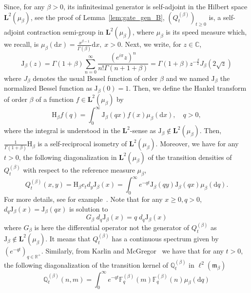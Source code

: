 \documentclass[AHL,Unicode,longabstracts]{cedram}
\newcommand{\fm}{\mathfrak{m}}
\newcommand{\esL}{\mathbf{L}}
\newcommand{\esLd}{\ell}
\newcommand{\Hg}{{\mathrm{H}}_{\beta}}
\newcommand{\Jg}{{\mathrm{J}}_{\beta}}
\newcommand*\R{{\mathbb R}}
\newcommand{\cont}[1]{{#1}}
\newcommand{\Lv}{\esL^2(\mu_{\beta})}
\newcommand{\Lpv}{\esLd^2(\fm_{\beta})}
\newcommand*{\dd}{\mathrm{d}}
\newcommand*{\dx}{\dd x}
\begin{document}
Since, for any $\beta >0$, its infinitesimal generator is self-adjoint in the Hilbert space $\esL^{2}({\mu}_{\beta})$, see the proof of Lemma~\ref{lem:gate_gen_B}, $ (\cont{Q}^{(\beta)}_t)_{t\geq0}$ is, a self-adjoint contraction semi-group in $\esL^{2}({\mu}_{\beta})$, where ${\mu}_{\beta}$ is its speed measure which, we recall, is ${\mu}_{\beta}(\dx)=\frac{x^{\beta-1}}{\Gamma(\beta)}\dx, \; x>0.$ Next, we write, for $z \in \mathbb{C}$,
\begin{equation*}\label{eq:def_bessel}
\Jg(z)=\Gamma(1+\beta)\sum_{n=0}^{\infty}\frac{(e^{i\pi}z)^n}{n!\Gamma(n+1+\beta)}=\Gamma(1+\beta)z^{-\frac{\beta}{2}}J_{\beta}(2\sqrt{z})
\end{equation*}
where $J_{\beta}$ denotes the usual Bessel function of order $\beta$ and we named $\Jg$ the normalized Bessel function as $\Jg(0)=1$. Then, we define the Hankel transform of order $\beta$ of a function $f\in \Lv$ by
\begin{equation*}\label{eq:defn_Hankel}
\Hg f(q) = \int_0^{\infty} \Jg(qx)f(x)\mu_{\beta}(\dx), \quad q>0,
\end{equation*}
where the integral is understood in the $\esL^{2}$-sense as $\Jg \notin \Lv$. Then, $\frac{1}{\Gamma(1+\beta)}\Hg$ is a self-reciprocal isometry of $\Lv$. Moreover, we have for any $t>0$, the following diagonalization in $\Lv$ of the transition densities of $Q^{(\beta)}_t$ with respect to the reference measure $\mu_{\beta}$,
\begin{equation*}\label{eq:diagP}
Q^{(\beta)}_t (x,y)=\Hg e_{t}\cont{d}_y\Jg (x)=\int_0^{\infty}e^{-qt}\Jg(qy) \Jg(qx)\mu_{\beta}(\dd q).
\end{equation*}
For more details, see for example~\cite{Muck-Stein}. Note that for any $x\geq 0, q>0$, $\cont{d}_q\Jg(x)=\Jg(qx)$ is solution to
\begin{equation*}\label{eq:bessel-eigen}
\cont{G}_{\beta}\; \cont{d}_q\Jg(x)=q\; \cont{d}_q\Jg(x)
\end{equation*}
where $\cont{G}_{\beta}$ is here the differential operator not the generator of $\cont{Q}_t^{(\beta)}$ as $\Jg \notin \Lv$. It means that $\cont{Q}_t^{(\beta)}$ has a continuous spectrum given by $(e^{-qt})_{q\in \R^+}$. Similarly, from Karlin and McGregor~\cite{KMcGlinear} we have that for any $t>0$, the following diagonalization of the transition kernel of $\mathbb Q^{(\beta)}_t$ in $\Lpv$
\begin{equation*}
\mathbb Q^{(\beta)}_t (n,m)=\int_0^{\infty}e^{-qt} {\mathbb{F}}^{(\beta)}_q(m) {\mathbb{F}}^{(\beta)}_q(n)\mu_{\beta}(\dd q)
\end{equation*}
\end{document}
